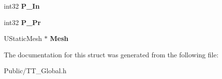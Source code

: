\begin{DoxyCompactItemize}
\mbox{\label{struct_f_t_t___struct___block_a4ef5ca71d71753d91fae493ea54d47c7}} 
int32 {\bfseries P\+\_\+\+In}
\item 
\mbox{\label{struct_f_t_t___struct___block_ab246a582aaf2645f68964a0ea34762f1}} 
int32 {\bfseries P\+\_\+\+Pr}
\item 
\mbox{\label{struct_f_t_t___struct___block_af6b899c8d59308bd3c14a9e1e9cfe963}} 
U\+Static\+Mesh $\ast$ {\bfseries Mesh}
\end{DoxyCompactItemize}


The documentation for this struct was generated from the following file\+:\begin{DoxyCompactItemize}
\item 
Public/T\+T\+\_\+\+Global.\+h\end{DoxyCompactItemize}
